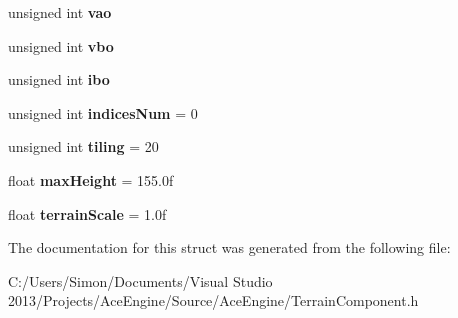 \begin{DoxyCompactItemize}
\item 
\hypertarget{struct_terrain_component_a3c5ef92da76bd61b3c9a70ac04f500e4}{}unsigned int {\bfseries vao}\label{struct_terrain_component_a3c5ef92da76bd61b3c9a70ac04f500e4}

\item 
\hypertarget{struct_terrain_component_a5ef9db788f2491af739c7d6b451db71e}{}unsigned int {\bfseries vbo}\label{struct_terrain_component_a5ef9db788f2491af739c7d6b451db71e}

\item 
\hypertarget{struct_terrain_component_aafbf4c13f411fcf31cdfdef44d88c199}{}unsigned int {\bfseries ibo}\label{struct_terrain_component_aafbf4c13f411fcf31cdfdef44d88c199}

\item 
\hypertarget{struct_terrain_component_a0ce843ffedafa48c4985ffa592a6b652}{}unsigned int {\bfseries indices\+Num} = 0\label{struct_terrain_component_a0ce843ffedafa48c4985ffa592a6b652}

\item 
\hypertarget{struct_terrain_component_a4fce750323d620ffb602f69815857cd6}{}unsigned int {\bfseries tiling} = 20\label{struct_terrain_component_a4fce750323d620ffb602f69815857cd6}

\item 
\hypertarget{struct_terrain_component_a8dbb4d6cfaa23cd174b12ff614505512}{}float {\bfseries max\+Height} = 155.\+0f\label{struct_terrain_component_a8dbb4d6cfaa23cd174b12ff614505512}

\item 
\hypertarget{struct_terrain_component_a3c382157822187a652730d2841a21412}{}float {\bfseries terrain\+Scale} = 1.\+0f\label{struct_terrain_component_a3c382157822187a652730d2841a21412}

\end{DoxyCompactItemize}


The documentation for this struct was generated from the following file\+:\begin{DoxyCompactItemize}
\item 
C\+:/\+Users/\+Simon/\+Documents/\+Visual Studio 2013/\+Projects/\+Ace\+Engine/\+Source/\+Ace\+Engine/Terrain\+Component.\+h\end{DoxyCompactItemize}
